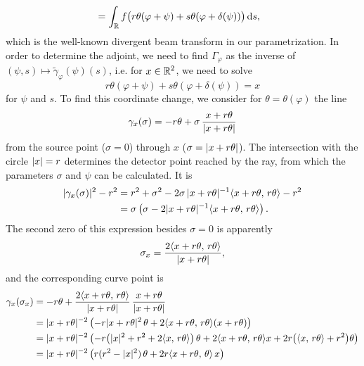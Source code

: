 \documentclass{amsart}
\renewcommand*{\phi}{\varphi}
\begin{document}
\begin{example}
\begin{align}
  &= \int_\RR f\big(r\theta(\phi + \psi) + s\theta(\phi + \delta(\psi))\big)\, \D s,
 \end{align}
 which is the well-known divergent beam transform in our parametrization. In order to determine the adjoint, we need to find
 $\Gamma_\phi$ as the inverse of $(\psi, s) \mapsto \tilde \gamma_\phi(\psi)(s)$, i.e. for $x \in {\ensuremath{\mathbb{R}}}^2$, we need to solve
 \begin{equation*}
  r\theta(\phi + \psi) + s\theta(\phi + \delta(\psi)) = x
 \end{equation*}
 for $\psi$ and $s$. To find this coordinate change, we consider for $\theta=\theta(\phi)$ the line
 \begin{equation*}
  \gamma_x(\sigma) = -r\theta + \sigma\, \frac{x+r\theta}{|x + r \theta|}
 \end{equation*}
 from the source point ($\sigma=0$) through $x$ ($\sigma=|x+r\theta|$). The intersection with the circle $|x|=r$ determines the 
 detector point reached by the ray, from which the parameters $\sigma$ and $\psi$ can be calculated. It is
 \begin{align*}
  |\gamma_x(\sigma)|^2 - r^2 
  &= r^2 + \sigma^2 - 2 \sigma\, |x + r \theta|^{-1} \langle x + r \theta,\,r\theta\rangle - r^2 \\
  &= \sigma \left(\sigma - 2 |x + r \theta|^{-1} \langle x + r \theta,\,r \theta\rangle\right).
 \end{align*}
 The second zero of this expression besides $\sigma=0$ is apparently
 \begin{equation}
  \label{eq:fanbeam_intersec_param}
  \sigma_x = \frac{2 \langle x + r \theta,\,r \theta\rangle}{|x + r \theta|} ,
 \end{equation} 
 and the corresponding curve point is
 \begin{align*}
  \gamma_x(\sigma_x) 
  &= -r \theta + \frac{2 \langle x + r \theta,\,r \theta\rangle}{|x + r \theta|}\, \frac{x + r\theta}{|x + r \theta|} \\
  &= |x + r \theta|^{-2} \left(-r |x + r\theta|^2\, \theta  + 2 \langle x + r \theta,\,r \theta\rangle (x + r\theta)\right) \\
  &= |x + r \theta|^{-2} \left(-r \big(|x|^2 + r^2 + 2\langle x,\,r\theta\rangle\big)\, \theta  +
  2 \langle x + r \theta,\,r \theta\rangle x + 2r \big(\langle x,\,r \theta\rangle + r^2\big)\theta \right) \\
  &= |x + r\theta|^{-2} \left(r(r^2 - |x|^2)\, \theta + 2r \langle x + r\theta,\,\theta\rangle\, x \right)
 \end{align*}

\end{example}
\end{document}

